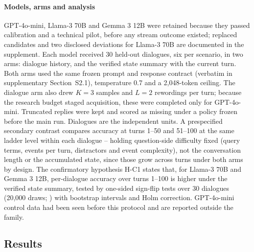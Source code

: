 \paragraph{Models, arms and analysis}
GPT-4o-mini, Llama-3 70B \citep{grattafiori2024llama3} and Gemma 3 12B
\citep{gemma2025gemma3} were retained because they passed calibration and a
technical pilot, before any stream outcome existed; replaced candidates and two
disclosed deviations for Llama-3 70B are documented in the supplement. Each
model received 30 held-out dialogues, six per scenario, in two arms: dialogue
history, and the verified state summary with the current turn. Both arms used the same frozen prompt and response contract (verbatim in
supplementary Section~S2.1), temperature 0.7 and a 2,048-token
ceiling.
The dialogue arm also drew $K=3$ samples and $L=2$ rewordings per turn;
because the research budget staged acquisition, these were completed only for
GPT-4o-mini. Truncated replies were kept and scored as missing under a policy
frozen before the main run. Dialogues are the independent units. A
prespecified secondary contrast compares accuracy at turns 1--50 and 51--100 at
the same ladder level within each dialogue -- holding question-side difficulty
fixed (query terms, events per turn, distractors and event complexity), not
the conversation length or the accumulated state, since those grow across
turns under both arms by design. The confirmatory hypothesis H-C1 states that,
for Llama-3 70B and Gemma 3 12B, per-dialogue accuracy over turns 1--100 is
higher under the verified state summary, tested by one-sided sign-flip tests
over 30 dialogues (20,000 draws;
\citealp{good2005permutation}) with bootstrap intervals and Holm correction.
GPT-4o-mini control data had been seen before this protocol and are reported
outside the family.

\subsection{Results}

